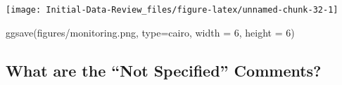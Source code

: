 \documentclass[
]{article}
\newenvironment{Shaded}{\begin{snugshade}}{\end{snugshade}}
\newcommand{\AttributeTok}[1]{\textcolor[rgb]{0.77,0.63,0.00}{#1}}
\newcommand{\DecValTok}[1]{\textcolor[rgb]{0.00,0.00,0.81}{#1}}
\newcommand{\FunctionTok}[1]{\textcolor[rgb]{0.00,0.00,0.00}{#1}}
\newcommand{\NormalTok}[1]{#1}
\newcommand{\StringTok}[1]{\textcolor[rgb]{0.31,0.60,0.02}{#1}}
\begin{document}
\begin{center}\texttt{[image: Initial-Data-Review\_files/figure-latex/unnamed-chunk-32-1]} \end{center}

\begin{Shaded}
\begin{Highlighting}[]
\FunctionTok{ggsave}\NormalTok{(}\StringTok{\textquotesingle{}figures/monitoring.png\textquotesingle{}}\NormalTok{, }\AttributeTok{type=}\StringTok{\textquotesingle{}cairo\textquotesingle{}}\NormalTok{,}
         \AttributeTok{width =} \DecValTok{6}\NormalTok{, }\AttributeTok{height =} \DecValTok{6}\NormalTok{)}
\end{Highlighting}
\end{Shaded}

\hypertarget{what-are-the-not-specified-comments}{%
\subsection{What are the ``Not Specified''
Comments?}\label{what-are-the-not-specified-comments}}
\end{document}
